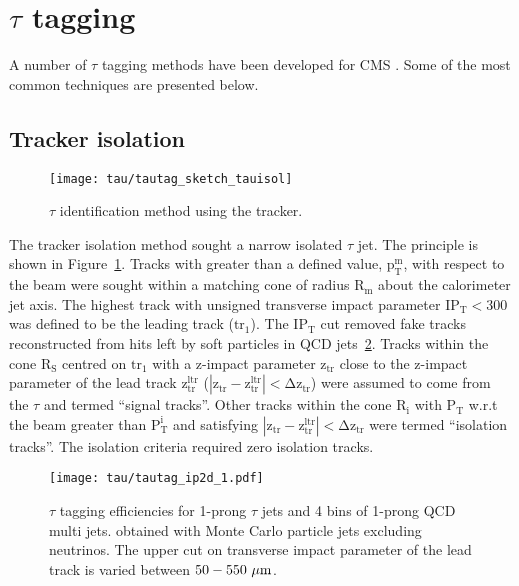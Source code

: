 \section{$\tau$ tagging}


A number of $\tau$ tagging methods have been developed for CMS \cite{CMS_TDR_PHYS_vol1, citeulike:800614}. Some of the most common techniques are presented below.

\subsection{Tracker isolation~\label{sec:tracker_isolation}}
\begin{figure}[!hHtb]
  \centering
  \texttt{[image: tau/tautag\_sketch\_tauisol]}
  \caption{$\tau$ identification method using the tracker.~\cite{CMS_TDR_PHYS_vol1, citeulike:800614}
  \label{fig:tracker_isol_sketch}}
\end{figure}

The tracker isolation method sought a narrow isolated $\tau$ jet. The principle is shown in Figure~\ref{fig:tracker_isol_sketch}. Tracks with \PT greater than a defined value, $\mathrm{p_{T}^{m}}$, with respect to the beam were sought within a matching cone of radius $\mathrm{R_{m}}$ about the calorimeter jet axis. The highest \PT track with unsigned transverse impact parameter $\mathrm{IP_{T} < 300}$\micron was defined to be the leading track ($\mathrm{tr_{1}}$). The $\mathrm{IP_{T}}$ cut removed fake tracks reconstructed from hits left by soft particles in QCD jets~\ref{fig:tau_ip}. Tracks within the cone $\mathrm{R_{S}}$ centred on $\mathrm{tr_{1}}$  with a z-impact parameter $\mathrm{z_{tr}}$ close to the z-impact parameter of the lead track $\mathrm{z_{tr}^{ltr}}$ ($\mathrm{|z_{tr} - z_{tr}^{ltr}| < \Delta z_{tr}}$) were assumed to come from the $\tau$ and termed ``signal tracks''. Other tracks within the cone $\mathrm{R_{i}}$ with $\mathrm{P_{T}}$ w.r.t the beam greater than $\mathrm{P_{T}^{i}}$ and satisfying $\mathrm{|z_{tr} - z_{tr}^{ltr}| < \Delta z_{tr}}$ were termed ``isolation tracks''. The isolation criteria required zero isolation tracks.

\begin{figure}[htb]
  \centering
  \texttt{[image: tau/tautag\_ip2d\_1.pdf]}
  \caption{$\tau$ tagging efficiencies for 1-prong $\tau$ jets and 4 \ETMC bins of 1-prong QCD multi jets. \ETMC obtained with Monte Carlo  particle jets excluding neutrinos. The upper cut on transverse impact parameter of the lead track is varied between $50-550~\mu \mathrm{m}$.~\cite{CMS_TDR_PHYS_vol1, citeulike:800614}
  \label{fig:tau_ip}}
\end{figure}


